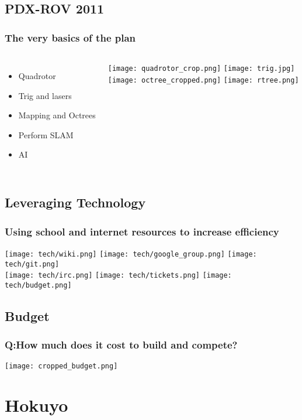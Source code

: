 \documentclass{beamer}
\begin{document}
\subsection{PDX-ROV 2011}
\frame
{
    \frametitle{The very basics of the plan}
    \begin{columns}[c]
    \begin{itemize}
        \item Quadrotor
        \item Trig and lasers
        \item Mapping and Octrees
        \item Perform SLAM
        \item AI
    \end{itemize}
    \texttt{[image: quadrotor\_crop.png]}
    \texttt{[image: trig.jpg]}
    \\
    \texttt{[image: octree\_cropped.png]}
    \texttt{[image: rtree.png]}
    \end{columns}
}

\subsection{Leveraging Technology}
\frame
{
    \frametitle{Using school and internet resources to increase efficiency}
    \texttt{[image: tech/wiki.png]}
    \texttt{[image: tech/google\_group.png]}
    \texttt{[image: tech/git.png]}
    \\  
    \texttt{[image: tech/irc.png]}
    \texttt{[image: tech/tickets.png]}
    \texttt{[image: tech/budget.png]}

}

\subsection{Budget}
\frame
{
    \frametitle{Q:How much does it cost to build and compete?}

    
    \texttt{[image: cropped\_budget.png]}

    
}
\section{Hokuyo}
\end{document}
